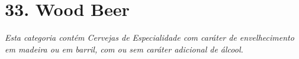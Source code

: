 \section*{33. Wood Beer}
\textit{Esta categoria contém Cervejas de Especialidade com caráter de envelhecimento em madeira ou em barril, com ou sem caráter adicional de álcool.}
